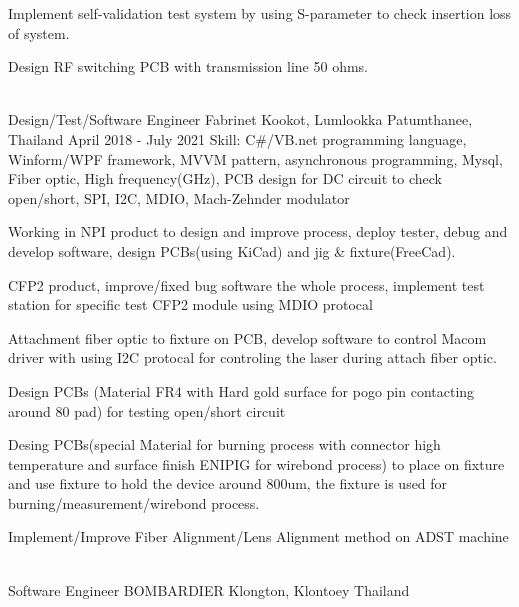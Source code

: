 \begin{cventries}
{\begin{cvitems}
      \item {Implement self-validation test system by using S-parameter to
        check insertion loss of system.}
      \item {Design RF switching PCB with transmission line 50 ohms.}
      \end{cvitems}
    }
\\
  \cventry
    {Design/Test/Software Engineer} %
    {Fabrinet} %
    {Kookot, Lumlookka Patumthanee, Thailand} %
    {April 2018 - July 2021} %
    {Skill: C\#/VB.net programming language, Winform/WPF framework, MVVM
    pattern, asynchronous programming, Mysql, Fiber optic, High frequency(GHz), PCB
    design for DC circuit to check open/short, SPI, I2C, MDIO, Mach-Zehnder modulator} %
    {
      \begin{cvitems} %
        \item {Working in NPI product to design and improve process,
          deploy tester, debug and develop software, design PCBs(using KiCad)
          and jig \& fixture(FreeCad).}
        \item {CFP2 product, improve/fixed bug software the whole process,
          implement test station for specific test CFP2 module using MDIO
          protocal}
        \item {Attachment fiber optic to fixture on PCB, develop software to
          control Macom driver with using I2C protocal for controling the laser
          during attach fiber optic.}
        \item {Design PCBs (Material FR4 with Hard gold surface for pogo pin
          contacting around 80 pad) for testing open/short circuit}
        \item {Desing PCBs(special Material for burning process with
          connector high temperature and surface finish ENIPIG for wirebond
          process) to place on fixture and use fixture to hold the device
          around 800um, the fixture is used for burning/measurement/wirebond
          process.}
        \item {Implement/Improve Fiber Alignment/Lens Alignment method on ADST machine}
      \end{cvitems}
    }
\\
  \cventry
    {Software Engineer} %
    {BOMBARDIER} %
    {Klongton, Klontoey Thailand} %

\end{cventries}

